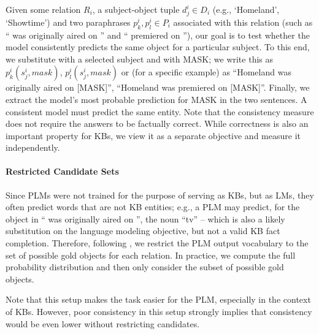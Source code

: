 Given some relation $R_i$, a subject-object tuple $d_j^i \in
D_i$ (e.g., `Homeland', `Showtime') and two paraphrases
$p_k^i, p_l^i \in P_i$ associated with this relation (such
as ``\subj{} was originally aired on \obj{}'' and ``\subj{}
premiered on \obj{}''), our goal is to test whether the
model consistently predicts the same object for a particular subject.
To this end, we
substitute \subj{} with a selected subject and \obj{} with
MASK; we write this as $p_k^i(s_j^i,mask)$,
$p_l^i(s_j^i,mask)$ or (for a specific example) as
``Homeland was originally aired on [MASK]'', ``Homeland was premiered on [MASK]''.
Finally, we extract the model's most probable prediction for
MASK in the two sentences.  A consistent model must predict
the same entity. Note that the consistency measure does not
require the answers to be factually correct. While
correctness is also an important property for KBs, we view
it as a separate objective and measure it independently. 


\paragraph{Restricted Candidate Sets}
Since PLMs were not trained for the purpose of
serving as KBs, but as LMs, they often predict words
that are not KB entities;
e.g., a PLM may predict, for the object in ``\subj{}
was originally aired on \obj{}'', the noun
``tv'' --  which is also a likely substitution on the language
modeling objective, but not a valid KB fact completion.
Therefore,
following \citep{Xiong2020Pretrained, nora@@},
we
restrict the PLM output vocabulary to the set of possible gold objects for each
relation. In practice, we compute the full probability
distribution and then only consider the subset of possible
gold objects.

Note that this setup makes the task easier for the PLM,
especially in the context of KBs. However, poor
consistency in this setup strongly implies that consistency
would be even lower without restricting candidates.
